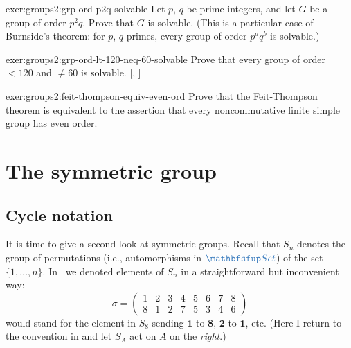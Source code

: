 \begin{exer}{}{exer:groups2:grp-ord-p2q-solvable}
  Let $p$, $q$ be prime integers, and let $G$ be a group of order
  $p^2 q$.  Prove that $G$ is solvable. (This is a particular case of
  Burnside's theorem: for $p$, $q$ primes, every group of order
  $p^a q^b$ is solvable.)
\end{exer}
\begin{exer}{}{exer:groups2:grp-ord-lt-120-neq-60-solvable}
  \exerused Prove that every group of order $< 120$ and $\neq 60$ is
  solvable.  [,
  ]
\end{exer}

\begin{exer}{}{exer:groups2:feit-thompson-equiv-even-ord}
  Prove that the Feit-Thompson theorem is equivalent to the assertion
  that every noncommutative finite simple group has even order.
\end{exer}

\section{The symmetric group}
\label{sec:groups2:the-symmetric-group}


\subsection{Cycle notation}
\label{subsec:groups2:cycle-notation}
It is time to give a second look at symmetric groups. Recall that
$S_n$ denotes the group of permutations (i.e., automorphisms in
$\categ{Set}$) of the set
$\{1,\dots,n\}$. In~ we denoted
elements of $S_n$ in a straightforward but inconvenient way:
\[
  \sigma = \begin{pmatrix} 1 & 2 & 3 & 4 & 5 & 6 & 7 & 8 \\
    8 & 1 & 2 & 7 & 5 & 3 & 4 & 6 \end{pmatrix}
\]
would stand for the element in $S_8$ sending $\mathbf{1}$ to
$\mathbf{8}$, $\mathbf{2}$ to $\mathbf{1}$, etc. (Here I return to the
convention in  and let $S_A$ act
on $A$ on the \emph{right}.)

